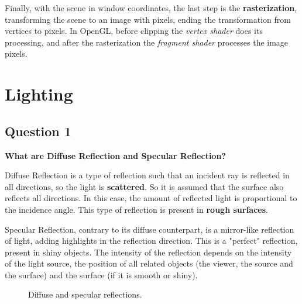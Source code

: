\documentclass[12pt]{article}
\begin{document}
Finally, with the scene in window coordinates, the last step is the \textbf{rasterization}, transforming the scene to an image with pixels, ending the transformation from vertices to pixels. In OpenGL, before clipping the \textit{vertex shader} does its processing, and after the rasterization the \textit{fragment shader} processes the image pixels.

\newpage

\section{Lighting}

\subsection*{Question 1}
{\bfseries What are Diffuse Reflection and Specular Reflection?}

Diffuse Reflection is a type of reflection such that an incident ray is reflected in all directions, so the light is \textbf{scattered}. So it is assumed that the surface also reflects all directions. In this case, the amount of reflected light is proportional to the incidence angle. This type of reflection is present in \textbf{rough surfaces}.

Specular Reflection, contrary to its diffuse counterpart, is a mirror-like reflection of light, adding highlights in the reflection direction. This is a "perfect" reflection, present in shiny objects. The intensity of the reflection depends on the intensity of the light source, the position of all related objects (the viewer, the source and the surface) and the surface (if it is smooth or shiny).

\begin{figure}
    \centering
    \caption{Diffuse and specular reflections.}
    \label{fig:diff_spec}
\end{figure}
\end{document}
